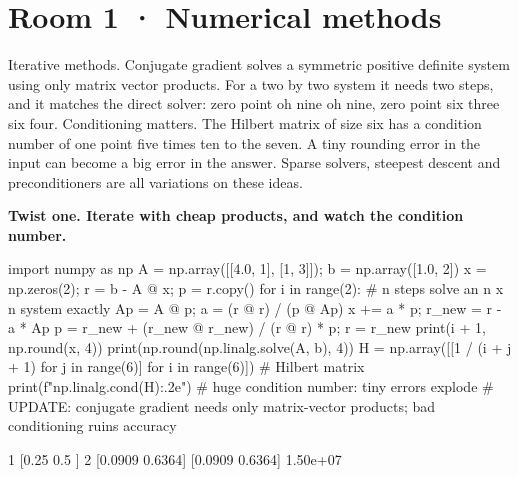 \documentclass[11pt,a4paper]{report}
\begin{document}
\section*{Room 1 · Numerical methods}
Iterative methods. Conjugate gradient solves a symmetric positive definite system using only matrix vector products. For a two by two system it needs two steps, and it matches the direct solver: zero point oh nine oh nine, zero point six three six four. Conditioning matters. The Hilbert matrix of size six has a condition number of one point five times ten to the seven. A tiny rounding error in the input can become a big error in the answer. Sparse solvers, steepest descent and preconditioners are all variations on these ideas.
\begin{tcolorbox}[colback=yellow!12,colframe=orange!70!black,boxrule=0.4pt,left=4pt,right=4pt,top=2pt,bottom=2pt]\textbf{Twist one. Iterate with cheap products, and watch the condition number.}\end{tcolorbox}
\begin{Code}
import numpy as np
A = np.array([[4.0, 1], [1, 3]]); b = np.array([1.0, 2])
x = np.zeros(2); r = b - A @ x; p = r.copy()
for i in range(2):                          # n steps solve an n x n system exactly
    Ap = A @ p; a = (r @ r) / (p @ Ap)
    x += a * p; r_new = r - a * Ap
    p = r_new + (r_new @ r_new) / (r @ r) * p; r = r_new
    print(i + 1, np.round(x, 4))
print(np.round(np.linalg.solve(A, b), 4))
H = np.array([[1 / (i + j + 1) for j in range(6)] for i in range(6)])   # Hilbert matrix
print(f"{np.linalg.cond(H):.2e}")           # huge condition number: tiny errors explode
# UPDATE: conjugate gradient needs only matrix-vector products; bad conditioning ruins accuracy
\end{Code}
\begin{Out}
1 [0.25 0.5 ]
2 [0.0909 0.6364]
[0.0909 0.6364]
1.50e+07
\end{Out}
\end{document}
